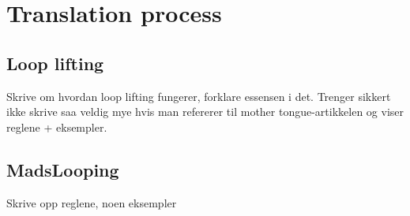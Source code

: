 \section{Translation process}
\subsection{Loop lifting}
\label{sect:method:loop_lifting}
Skrive om hvordan loop lifting fungerer, forklare essensen i det. Trenger
sikkert ikke skrive saa veldig mye hvis man refererer til mother
tongue-artikkelen og viser reglene + eksempler. 

\subsection{MadsLooping}
\label{sect:method:madslifting}
Skrive opp reglene, noen eksempler